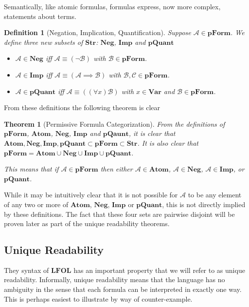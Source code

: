 \documentclass[12pt]{article}
\theoremstyle{break}
\newtheorem{definition}{Definition}[section]
\theoremstyle{break}
\newtheorem{theorem}{Theorem}[section]
\theoremstyle{break}
\theoremstyle{break}
\theoremstyle{break}
\newtheorem{informal definition}[definition]{Informal Definition}
\newcommand{\mc}[1]{\mathcal{#1}}
\begin{document}
Semantically, like atomic formulas, formulas express, now more complex, statements about terms.

\begin{definition}[Negation, Implication, Quantification]
Suppose $\mc{A}\in\textbf{pForm}$.
We define three new subsets of $\textbf{Str}$: $\textbf{Neg}$, $\textbf{Imp}$ and $\textbf{pQuant}$
\begin{itemize}
\item{$\mc{A}\in\textbf{Neg}$ iff $\mc{A}\equiv (\lnot \mc{B})$ with $\mc{B}\in\textbf{pForm}$.}
\item{$\mc{A}\in\textbf{Imp}$ iff $\mc{A}\equiv (\mc{A}\implies \mc{B})$ with $\mc{B}, \mc{C}\in\textbf{pForm}$.}
\item{$\mc{A}\in\textbf{pQuant}$ iff $\mc{A} \equiv ((\forall x)\mc{B})$ with $x\in\textbf{Var}$ and $\mc{B}\in\textbf{pForm}$.}
\end{itemize}
\end{definition}

From these definitions the following theorem is clear

\begin{theorem}[Permissive Formula Categorization]
From the definitions of $\textbf{pForm}$, $\textbf{Atom}$, $\textbf{Neg}$, $\textbf{Imp}$ and $\textbf{pQaunt}$, it is clear that $\textbf{Atom}, \textbf{Neg}, \textbf{Imp}, \textbf{pQuant} \subset \textbf{pForm}\subset \textbf{Str}$.
It is also clear that $\textbf{pForm} = \textbf{Atom}\cup \textbf{Neg} \cup \textbf{Imp} \cup \textbf{pQuant}$.

This means that if $\mc{A}\in\textbf{pForm}$ then either $\mc{A}\in\textbf{Atom}$, $\mc{A}\in\textbf{Neg}$, $\mc{A}\in\textbf{Imp}$, or $\textbf{pQuant}$.
\end{theorem}

While it may be intuitively clear that it is not possible for $\mc{A}$ to be any element of any two or more of $\textbf{Atom}$, $\textbf{Neg}$, $\textbf{Imp}$ or $\textbf{pQuant}$, this is not directly implied by these definitions.
The fact that these four sets are pairwise disjoint will be proven later as part of the unique readability theorems.

\subsection{Unique Readability}

They syntax of $\textbf{LFOL}$ has an important property that we will refer to as unique readability.
Informally, unique readability means that the language has no ambiguity in the sense that each formula can be interpreted in exactly one way.
This is perhaps easiest to illustrate by way of counter-example.
\end{document}
